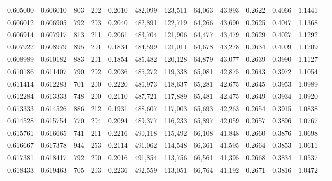 \begin{tabular}{rrrrrrrrrrrrr}
0.605000 & 0.606010 &    803 &   202 &                                     0.2010 & 482,099 & 123,511 &  64,063 &  43,893 & 0.2622 & 0.4066 & 1.1441 \\
0.606012 & 0.606905 &    792 &   203 &                                     0.2040 & 482,891 & 122,719 &  64,266 &  43,690 & 0.2625 & 0.4047 & 1.1368 \\
0.606914 & 0.607917 &    813 &   211 &                                     0.2061 & 483,704 & 121,906 &  64,477 &  43,479 & 0.2629 & 0.4027 & 1.1292 \\
0.607922 & 0.608979 &    895 &   201 &                                     0.1834 & 484,599 & 121,011 &  64,678 &  43,278 & 0.2634 & 0.4009 & 1.1209 \\
0.608989 & 0.610182 &    883 &   201 &                                     0.1854 & 485,482 & 120,128 &  64,879 &  43,077 & 0.2639 & 0.3990 & 1.1127 \\
0.610186 & 0.611407 &    790 &   202 &                                     0.2036 & 486,272 & 119,338 &  65,081 &  42,875 & 0.2643 & 0.3972 & 1.1054 \\
0.611414 & 0.612283 &    701 &   200 &                                     0.2220 & 486,973 & 118,637 &  65,281 &  42,675 & 0.2645 & 0.3953 & 1.0989 \\
0.612284 & 0.613333 &    748 &   200 &                                     0.2110 & 487,721 & 117,889 &  65,481 &  42,475 & 0.2649 & 0.3934 & 1.0920 \\
0.613333 & 0.614526 &    886 &   212 &                                     0.1931 & 488,607 & 117,003 &  65,693 &  42,263 & 0.2654 & 0.3915 & 1.0838 \\
0.614528 & 0.615754 &    770 &   204 &                                     0.2094 & 489,377 & 116,233 &  65,897 &  42,059 & 0.2657 & 0.3896 & 1.0767 \\
0.615761 & 0.616665 &    741 &   211 &                                     0.2216 & 490,118 & 115,492 &  66,108 &  41,848 & 0.2660 & 0.3876 & 1.0698 \\
0.616667 & 0.617378 &    944 &   253 &                                     0.2114 & 491,062 & 114,548 &  66,361 &  41,595 & 0.2664 & 0.3853 & 1.0611 \\
0.617381 & 0.618417 &    792 &   200 &                                     0.2016 & 491,854 & 113,756 &  66,561 &  41,395 & 0.2668 & 0.3834 & 1.0537 \\
0.618433 & 0.619463 &    705 &   203 &                                     0.2236 & 492,559 & 113,051 &  66,764 &  41,192 & 0.2671 & 0.3816 & 1.0472 \\

\end{tabular}
